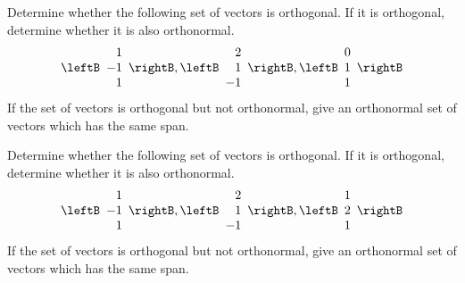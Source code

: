 \begin{enumialphparenastyle}
\begin{ex} Determine whether the following set of vectors is orthogonal. If it is
orthogonal, determine whether it is also orthonormal.
\begin{equation*}
\leftB 
\begin{array}{r}
1 \\ 
-1 \\ 
1
\end{array}
\rightB ,\leftB 
\begin{array}{r}
2 \\ 
1 \\ 
-1
\end{array}
\rightB ,\leftB 
\begin{array}{c}
0 \\ 
1 \\ 
1
\end{array}
\rightB
\end{equation*}
If the set of vectors is orthogonal but not orthonormal, give an orthonormal
set of vectors which has the same span.
\end{ex}


\begin{ex} Determine whether the following set of vectors is orthogonal. If it is
orthogonal, determine whether it is also orthonormal.
\begin{equation*}
\leftB 
\begin{array}{r}
1 \\ 
-1 \\ 
1
\end{array}
\rightB ,\leftB 
\begin{array}{r}
2 \\ 
1 \\ 
-1
\end{array}
\rightB ,\leftB 
\begin{array}{c}
1 \\ 
2 \\ 
1
\end{array}
\rightB
\end{equation*}
If the set of vectors is orthogonal but not orthonormal, give an orthonormal
set of vectors which has the same span.
\end{ex}



\end{enumialphparenastyle}
